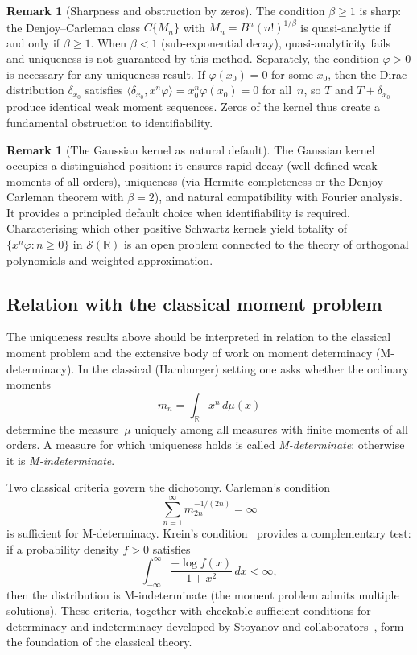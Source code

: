 \documentclass[12pt]{article}
\theoremstyle{definition}
\newtheorem{remark}[theorem]{Remark}
\newcommand{\R}{\mathbb{R}}
\begin{document}
\begin{remark}[Sharpness and obstruction by zeros]\label{rem:sharpness}
The condition $\beta \geq 1$ is sharp: the Denjoy--Carleman class $C\{M_n\}$ with $M_n = B^n(n!)^{1/\beta}$ is quasi-analytic if and only if $\beta \geq 1$.  When $\beta < 1$ (sub-exponential decay), quasi-analyticity fails and uniqueness is not guaranteed by this method.  Separately, the condition $\varphi > 0$ is necessary for any uniqueness result.  If $\varphi(x_0) = 0$ for some $x_0$, then the Dirac distribution $\delta_{x_0}$ satisfies $\langle \delta_{x_0}, x^n\varphi\rangle = x_0^n\varphi(x_0) = 0$ for all~$n$, so $T$ and $T + \delta_{x_0}$ produce identical weak moment sequences.  Zeros of the kernel thus create a fundamental obstruction to identifiability.
\end{remark}

\begin{remark}[The Gaussian kernel as natural default]\label{rem:gauss-natural}
The Gaussian kernel occupies a distinguished position: it ensures rapid decay (well-defined weak moments of all orders), uniqueness (via Hermite completeness or the Denjoy--Carleman theorem with $\beta=2$), and natural compatibility with Fourier analysis.  It provides a principled default choice when identifiability is required.  Characterising which other positive Schwartz kernels yield totality of $\{x^n\varphi:n\ge 0\}$ in $\mathcal{S}(\R)$ is an open problem connected to the theory of orthogonal polynomials and weighted approximation.
\end{remark}

\subsection{Relation with the classical moment problem}
\label{subsec:classical-moment-problem}

The uniqueness results above should be interpreted in relation to the
classical moment problem and the extensive body of work on moment
determinacy (M-determinacy).  In the classical (Hamburger) setting one
asks whether the ordinary moments
\[
   m_n = \int_\R x^n\, d\mu(x)
\]
determine the measure~$\mu$ uniquely among all measures with finite
moments of all orders.  A measure for which uniqueness holds is called
\emph{M-determinate}; otherwise it is \emph{M-indeterminate}.

Two classical criteria govern the dichotomy.
Carleman's condition~\cite{Shohat1943}
\[
   \sum_{n=1}^\infty m_{2n}^{-1/(2n)} = \infty
\]
is sufficient for M-determinacy.
Krein's condition~\cite{Stoyanov2000Krein} provides a complementary test:
if a probability density $f>0$ satisfies
\[
   \int_{-\infty}^{\infty}
   \frac{-\log f(x)}{1+x^2}\,dx < \infty,
\]
then the distribution is M-indeterminate (the moment problem admits
multiple solutions).  These criteria, together with checkable
sufficient conditions for determinacy and indeterminacy developed by
Stoyanov and collaborators~\cite{Stoyanov2013,LinKopanovStoyanov2020,StoyanovInverardiTagliani2023},
form the foundation of the classical theory.
\end{document}
